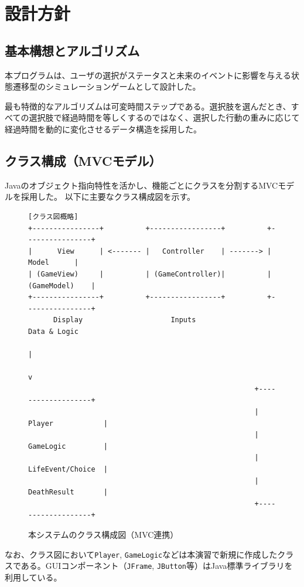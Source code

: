 \documentclass[a4paper,11pt]{jsarticle}
\begin{document}
\section{設計方針}
\subsection{基本構想とアルゴリズム}
本プログラムは、ユーザの選択がステータスと未来のイベントに影響を与える状態遷移型のシミュレーションゲームとして設計した。

最も特徴的なアルゴリズムは可変時間ステップである。選択肢を選んだとき、すべての選択肢で経過時間を等しくするのではなく、選択した行動の重みに応じて経過時間を動的に変化させるデータ構造を採用した。

\subsection{クラス構成（MVCモデル）}
Javaのオブジェクト指向特性を活かし、機能ごとにクラスを分割するMVCモデルを採用した。
以下に主要なクラス構成図を示す。

\begin{figure}[H]
\centering
\begin{verbatim}
[クラス図概略]
+----------------+          +-----------------+          +----------------+
|      View      | <------- |   Controller    | -------> |     Model      |
| (GameView)     |          | (GameController)|          | (GameModel)    |
+----------------+          +-----------------+          +----------------+
      Display                     Inputs                    Data & Logic
                                                                |
                                                                v
                                                      +-------------------+
                                                      | Player            |
                                                      | GameLogic         |
                                                      | LifeEvent/Choice  |
                                                      | DeathResult       |
                                                      +-------------------+
\end{verbatim}
\caption{本システムのクラス構成図（MVC連携）}
\end{figure}

なお、クラス図において\texttt{Player}, \texttt{GameLogic}などは本演習で新規に作成したクラスである。GUIコンポーネント（\texttt{JFrame}, \texttt{JButton}等）はJava標準ライブラリを利用している。
\end{document}
